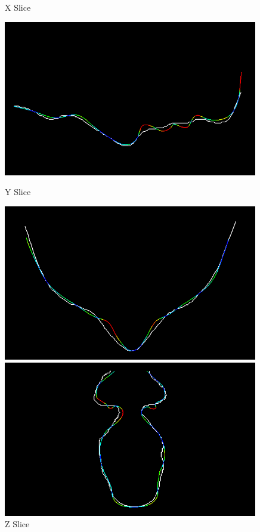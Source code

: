 \begin{figure}
  \centering
  \begin{minipage}{.325\textwidth}
    \centering
    \caption*{X Slice}
    \includegraphics[width=0.99\textwidth]{Figures/eval/our/3/x.png}
  \end{minipage}
  \begin{minipage}{.325\textwidth}
    \centering
    \caption*{Y Slice}
    \includegraphics[width=0.99\textwidth]{Figures/eval/our/3/y.png}
  \end{minipage}
  \begin{minipage}{.325\textwidth}
    \centering
    \caption*{Z Slice}
    \includegraphics[width=0.99\textwidth]{Figures/eval/our/3/z.png}
  \end{minipage}


\end{figure}
